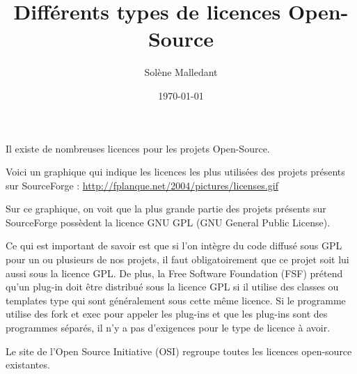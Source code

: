 \documentclass[12pt,a4paper]{article}
\title{Différents types de licences Open-Source}
\author{Solène Malledant}
\date{\today}
\begin{document}
\maketitle
Il existe de nombreuses licences pour les projets Open-Source.

Voici un graphique qui indique les licences les plus utilisées des projets présents sur SourceForge :
\vskip5mm
\url{http://fplanque.net/2004/pictures/licenses.gif}

\vskip1cm
Sur ce graphique, on voit que la plus grande partie des projets présents sur SourceForge possèdent la licence GNU GPL (GNU General Public License).

Ce qui est important de savoir est que si l'on intègre du code diffusé sous GPL pour un ou plusieurs de nos projets, il faut obligatoirement que ce projet soit lui aussi sous la licence GPL.
De plus, la Free Software Foundation (FSF) prétend qu'un plug-in doit \^{e}tre distribué sous la licence GPL si il utilise des classes ou templates type qui sont généralement sous cette m\^{e}me licence. 
Si le programme utilise des fork et exec pour appeler les plug-ins et que les plug-ins sont des programmes séparés, il n'y a pas d'exigences pour le type de licence à avoir.

Le site de l'Open Source Initiative (OSI) regroupe toutes les licences open-source existantes. 
\end{document}
